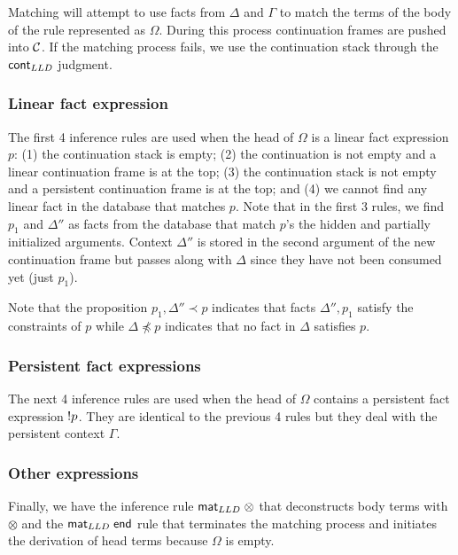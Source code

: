 Matching will attempt to use facts from $\Delta$ and $\Gamma$ to match the terms
of the body of the rule represented as $\Omega$. During this process
continuation frames are pushed into $\mathcal{C}$.  If the matching process
fails, we use the continuation stack through the $\mathsf{cont}_{LLD} \;$judgment.

\subsubsection{Linear fact expression}

The first 4 inference rules are used when the head of $\Omega$ is a linear fact
expression $p$: (1) the continuation stack is empty; (2) the continuation is not
empty and a linear continuation frame is at the top; (3) the continuation stack
is not empty and a persistent continuation frame is at the top; and (4) we
cannot find any linear fact in the database that matches $p$. Note that in the
first 3 rules, we find $p_1$ and $\Delta''$ as facts from the database that
match $p$'s the hidden and partially initialized arguments.  Context $\Delta''$
is stored in the second argument of the new continuation frame but passes along
with $\Delta$ since they have not been consumed yet (just $p_1$).

Note that the proposition $p_1, \Delta'' \prec p$ indicates that facts
$\Delta'', p_1$ satisfy the constraints of $p$ while $\Delta \npreceq p$
indicates that no fact in $\Delta$ satisfies $p$.



\subsubsection{Persistent fact expressions}

The next 4 inference rules are used when the head of $\Omega$ contains a
persistent fact expression ${!} p$. They are identical to the previous 4 rules
but they deal with the persistent context $\Gamma$.



\subsubsection{Other expressions}

Finally, we have the inference rule $\mathsf{mat}_{LLD} \; \otimes$ that deconstructs body terms
with $\otimes$ and the $\mathsf{mat}_{LLD} \; \mathsf{end}$ rule that terminates the matching process
and initiates the derivation of head terms because $\Omega$ is empty.

